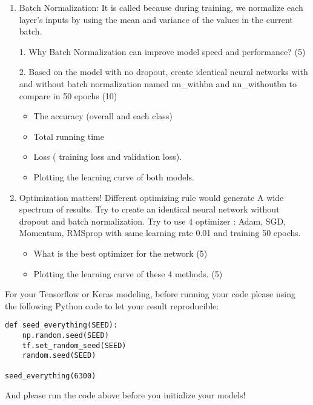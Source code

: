 \documentclass[12pt,epsf]{article}
\begin{document}
\begin{enumerate}
\begin{enumerate}
\begin{enumerate}
\item Batch Normalization: It is called because during training, we normalize each layer's inputs by using the mean and variance of the values in the current batch.

1.  Why Batch Normalization can improve model speed and performance? (5)

2. Based on the model with no dropout, create identical neural networks with and without batch normalization named nn\_withbn and nn\_withoutbn to compare in 50 epochs (10)

\begin{itemize}
\item  The accuracy (overall and each class)
\item  Total running time
\item  Loss ( training loss and validation loss).
\item  Plotting the learning curve of both models.
\end{itemize}


 
\item Optimization matters! Different optimizing rule would generate A wide spectrum of results. Try to create an identical neural network without dropout and batch normalization. Try to use 4 optimizer : Adam, SGD, Momentum, RMSprop with same learning rate 0.01 and training 50 epochs.

\begin{itemize}
	\item  What is the best optimizer for the network   (5)
	\item  Plotting the learning curve of these 4 methods. (5)
\end{itemize}

\end{enumerate}

For your Tensorflow or Keras modeling, before running your code please using the following Python code to let your result reproducible:

\begin{verbatim}
def seed_everything(SEED):
    np.random.seed(SEED)
    tf.set_random_seed(SEED)
    random.seed(SEED)
    
seed_everything(6300)
\end{verbatim}

And please run the code above before you initialize your models!




\end{enumerate}
\end{enumerate}
\end{document}
